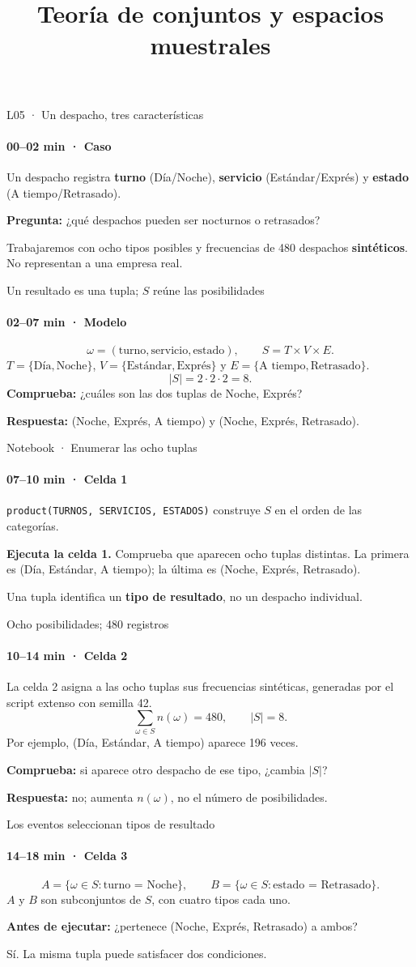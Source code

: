 \documentclass[aspectratio=169,11pt,spanish]{beamer}
\title[L05 · 40 minutos]{Teoría de conjuntos y espacios muestrales}
\begin{document}
\begin{frame}{L05 · Un despacho, tres características}
\framesubtitle{00–02 min · Caso}
Un despacho registra \textbf{turno} (Día/Noche), \textbf{servicio} (Estándar/Exprés) y \textbf{estado} (A tiempo/Retrasado).

\medskip
\textbf{Pregunta:} ¿qué despachos pueden ser nocturnos o retrasados?

\medskip
Trabajaremos con ocho tipos posibles y frecuencias de 480 despachos \textbf{sintéticos}. No representan a una empresa real.
\end{frame}
\begin{frame}{Un resultado es una tupla; $S$ reúne las posibilidades}
\framesubtitle{02–07 min · Modelo}
\[
\omega=(\text{turno},\text{servicio},\text{estado}),\qquad S=T\times V\times E.
\]
$T=\{\text{Día},\text{Noche}\}$, $V=\{\text{Estándar},\text{Exprés}\}$ y $E=\{\text{A tiempo},\text{Retrasado}\}$.
\[
|S|=2\cdot2\cdot2=8.
\]
\textbf{Comprueba:} ¿cuáles son las dos tuplas de Noche, Exprés?

\medskip
\textbf{Respuesta:} (Noche, Exprés, A tiempo) y (Noche, Exprés, Retrasado).
\end{frame}
\begin{frame}{Notebook · Enumerar las ocho tuplas}
\framesubtitle{07–10 min · Celda 1}
\texttt{product(TURNOS, SERVICIOS, ESTADOS)} construye $S$ en el orden de las categorías.

\medskip
\textbf{Ejecuta la celda 1.} Comprueba que aparecen ocho tuplas distintas. La primera es (Día, Estándar, A tiempo); la última es (Noche, Exprés, Retrasado).

\medskip
Una tupla identifica un \textbf{tipo de resultado}, no un despacho individual.
\end{frame}
\begin{frame}{Ocho posibilidades; 480 registros}
\framesubtitle{10–14 min · Celda 2}
La celda 2 asigna a las ocho tuplas sus frecuencias sintéticas, generadas por el script extenso con semilla 42.
\[
\sum_{\omega\in S}n(\omega)=480,\qquad |S|=8.
\]
Por ejemplo, (Día, Estándar, A tiempo) aparece 196 veces.

\medskip
\textbf{Comprueba:} si aparece otro despacho de ese tipo, ¿cambia $|S|$?

\medskip
\textbf{Respuesta:} no; aumenta $n(\omega)$, no el número de posibilidades.
\end{frame}
\begin{frame}{Los eventos seleccionan tipos de resultado}
\framesubtitle{14–18 min · Celda 3}
\[
A=\{\omega\in S:\text{turno = Noche}\},\qquad
B=\{\omega\in S:\text{estado = Retrasado}\}.
\]
$A$ y $B$ son subconjuntos de $S$, con cuatro tipos cada uno.

\medskip
\textbf{Antes de ejecutar:} ¿pertenece (Noche, Exprés, Retrasado) a ambos?

\medskip
Sí. La misma tupla puede satisfacer dos condiciones.
\end{frame}
\end{document}
